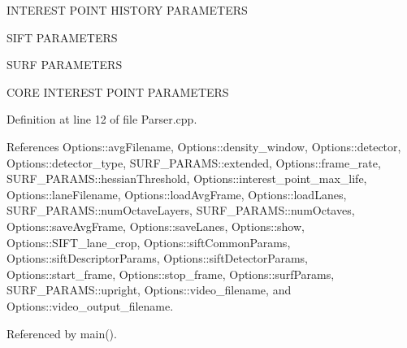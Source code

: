 \-I\-N\-T\-E\-R\-E\-S\-T \-P\-O\-I\-N\-T \-H\-I\-S\-T\-O\-R\-Y \-P\-A\-R\-A\-M\-E\-T\-E\-R\-S

\-S\-I\-F\-T \-P\-A\-R\-A\-M\-E\-T\-E\-R\-S

\-S\-U\-R\-F \-P\-A\-R\-A\-M\-E\-T\-E\-R\-S

\-C\-O\-R\-E \-I\-N\-T\-E\-R\-E\-S\-T \-P\-O\-I\-N\-T \-P\-A\-R\-A\-M\-E\-T\-E\-R\-S 

\-Definition at line 12 of file \-Parser.\-cpp.



\-References \-Options\-::avg\-Filename, \-Options\-::density\-\_\-window, \-Options\-::detector, \-Options\-::detector\-\_\-type, \-S\-U\-R\-F\-\_\-\-P\-A\-R\-A\-M\-S\-::extended, \-Options\-::frame\-\_\-rate, \-S\-U\-R\-F\-\_\-\-P\-A\-R\-A\-M\-S\-::hessian\-Threshold, \-Options\-::interest\-\_\-point\-\_\-max\-\_\-life, \-Options\-::lane\-Filename, \-Options\-::load\-Avg\-Frame, \-Options\-::load\-Lanes, \-S\-U\-R\-F\-\_\-\-P\-A\-R\-A\-M\-S\-::num\-Octave\-Layers, \-S\-U\-R\-F\-\_\-\-P\-A\-R\-A\-M\-S\-::num\-Octaves, \-Options\-::save\-Avg\-Frame, \-Options\-::save\-Lanes, \-Options\-::show, \-Options\-::\-S\-I\-F\-T\-\_\-lane\-\_\-crop, \-Options\-::sift\-Common\-Params, \-Options\-::sift\-Descriptor\-Params, \-Options\-::sift\-Detector\-Params, \-Options\-::start\-\_\-frame, \-Options\-::stop\-\_\-frame, \-Options\-::surf\-Params, \-S\-U\-R\-F\-\_\-\-P\-A\-R\-A\-M\-S\-::upright, \-Options\-::video\-\_\-filename, and \-Options\-::video\-\_\-output\-\_\-filename.



\-Referenced by main().


